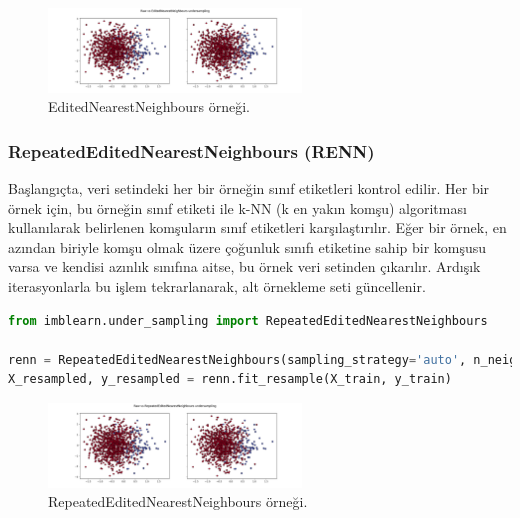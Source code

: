\begin{figure}[h]
    \centering
    \includegraphics[width=0.6\textwidth]{images/Raw vs EditedNearestNeighbours undersampling.png}
    \caption{EditedNearestNeighbours örneği.}
    \label{fig:enter-label}
\end{figure}

\newpage

\subsubsection{RepeatedEditedNearestNeighbours (RENN)}
Başlangıçta, veri setindeki her bir örneğin sınıf etiketleri kontrol edilir. Her bir örnek için, bu örneğin sınıf etiketi ile k-NN (k en yakın komşu) algoritması kullanılarak belirlenen komşuların sınıf etiketleri karşılaştırılır. Eğer bir örnek, en azından biriyle komşu olmak üzere çoğunluk sınıfı etiketine sahip bir komşusu varsa ve kendisi azınlık sınıfına aitse, bu örnek veri setinden çıkarılır. Ardışık iterasyonlarla bu işlem tekrarlanarak, alt örnekleme seti güncellenir.

\begin{lstlisting}[language=Python]
from imblearn.under_sampling import RepeatedEditedNearestNeighbours

renn = RepeatedEditedNearestNeighbours(sampling_strategy='auto', n_neighbors=200, kind_sel='all', max_iter=250)
X_resampled, y_resampled = renn.fit_resample(X_train, y_train)
\end{lstlisting}

\begin{figure}[h]
    \centering
    \includegraphics[width=0.6\textwidth]{images/Raw vs RepeatedEditedNearestNeighbours undersampling.png}
    \caption{RepeatedEditedNearestNeighbours örneği.}
    \label{fig:enter-label}
\end{figure}

\newpage

